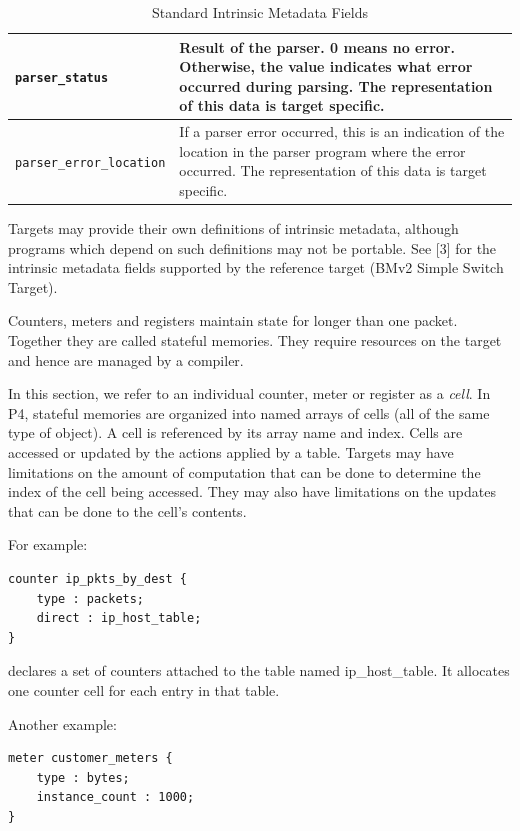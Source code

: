 \documentclass[12pt]{article}
\begin{document}
\begin{table}[H]
\begin{center}
\begin{tabular}{| l | p{} |}
\texttt{parser_status} &
Result of the parser. 0 means no error. Otherwise, the value indicates what 
error occurred during parsing. The representation of this data is target specific.\\ \hline
\texttt{parser_error_location} &
If a parser error occurred, this is an indication of the location in the parser 
program where the error occurred. The representation of this data is target specific. \\ \hline
\end{tabular}
\end{center}
\caption{Standard Intrinsic Metadata Fields}
\label{tab:stanmetadata}
\end{table}

Targets may provide their own definitions of intrinsic metadata, although 
programs which depend on such definitions may not be portable. 
See [3] for the intrinsic metadata fields supported by the reference target (BMv2 Simple Switch Target).


Counters, meters and registers maintain state for longer than one packet. 
Together they are called stateful memories. They require resources on the 
target and hence are managed by a compiler.

In this section, we refer to an individual counter, meter or register as a 
\textit{cell}. In P4, stateful memories are organized into named arrays of cells 
(all of the same type of object). A cell is referenced by its array name and 
index. Cells are accessed or updated by the actions applied by a table. Targets 
may have limitations on the amount of computation that can be done to determine 
the index of the cell being accessed.  They may also have limitations on 
the updates that can be done to the cell's contents.

For example:

\begin{lstlisting}[keywords={},frame=single,escapechar=\@]
counter ip_pkts_by_dest {
    type : packets;
    direct : ip_host_table;
}
\end{lstlisting}


declares a set of counters attached to the table named ip_host_table. It 
allocates one counter cell for each entry in that table.

Another example:

\begin{lstlisting}[keywords={},frame=single,escapechar=\@]
meter customer_meters {
    type : bytes;
    instance_count : 1000;
}
\end{lstlisting}
\end{document}
